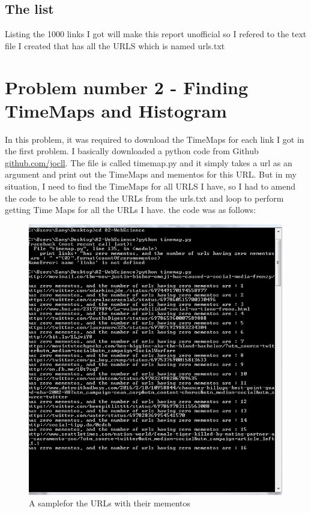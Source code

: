 \documentclass{article}
\begin{document}
\subsection{The list}
Listing the 1000 links I got will make this report unofficial so I refered to the text file I created that has all the URLS which is named urls.txt


\section{Problem number 2 - Finding TimeMaps and Histogram}

In this problem, it was required to download the TimeMaps for each link I got in the first problem. I basically downloaded a python code from Github \url{github.com/jocll}. The file is called timemap.py and it simply takes a url as an argument and print out the TimeMaps and mementos for this URL.
But in my situation, I need to find the TimeMaps for all URLS I have, so I had to amend the code to be able to read the URLs from the urls.txt and loop to perform getting Time Maps for all the URLs I have. the code was as follows:



\begin{figure}
\centering
\includegraphics[scale=0.75]{q2mementosnumbers.png}
\caption{A samplefor the URLs with their mementos}
\label{fig:q2mementosnumbers}
\end{figure}
\end{document}
